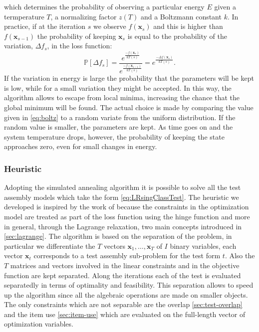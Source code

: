 which determines the probability of observing a particular energy $E$ given a termperature $T$, a normalizing factor $z(T)$ and a Boltzmann constant $k$. In practice, if at the iteration $s$ we observe $f(\mathbf{x}_s)$ and this is higher than $f(\mathbf{x}_{s-1})$ the probability of keeping $\mathbf{x}_s$ is equal to the probability of the variation, $\Delta f_s$, in the loss function:
\begin{equation}\label{eq:boltz}
\mathbb{P}\left[\Delta f_s\right]=\frac{e^{\frac{-f(\mathbf{x}_s)}{kT(s)}}}{e^{\frac{-f(\mathbf{x}_{s-1})}{kT(s)}}}= e^{\frac{-\Delta f(\mathbf{x}_s)}{kT(s)}}.
\end{equation}
If the variation in energy is large the probability that the parameters will be kept is low, while for a small variation they might be accepted. In this way, the algorithm allows to escape from local minima, increasing the chance that the global minimum will be found. The actual choice is made by comparing the value given in \eqref{eq:boltz} to a random variate from the uniform distribution. If the random value is smaller, the parameters are kept. As time goes on and the system temperature drops, however, the probability of keeping the state approaches zero, even for small changes in energy.

\subsubsection{Heuristic}\label{sec:heur}

Adopting the simulated annealing algorithm it is possible to solve all the test assembly models which take the form \eqref{eq:LRsingClassTest}. The heuristic we developed is inspired by the work of \textcite{Stocking1993} because the constraints in the optimization model are treated as part of the loss function using the hinge function and more in general, through the Lagrange relaxation, two main concepts introduced in \ref{sec:lagrange}. 
The algorithm is based on the separation of the problem, in particular we differentiate the $T$ vectors $\mathbf{x}_1, \ldots, \mathbf{x}_T$ of $I$ binary variables, each vector $\mathbf{x}_t$ corresponds to a test assembly sub-problem for the test form $t$. Also the $T$ matrices and vectors involved in the linear constraints and in the objective function are kept separated. Along the iterations each of the test is evaluated separatedly in terms of optimality and feasibility. This separation allows to speed up the algorithm since all the algebraic operations are made on smaller objects. The only constraints which are not separable are the overlap \ref{sec:test-overlap} and the item use \ref{sec:item-use} which are evaluated on the full-length vector of optimization variables.

